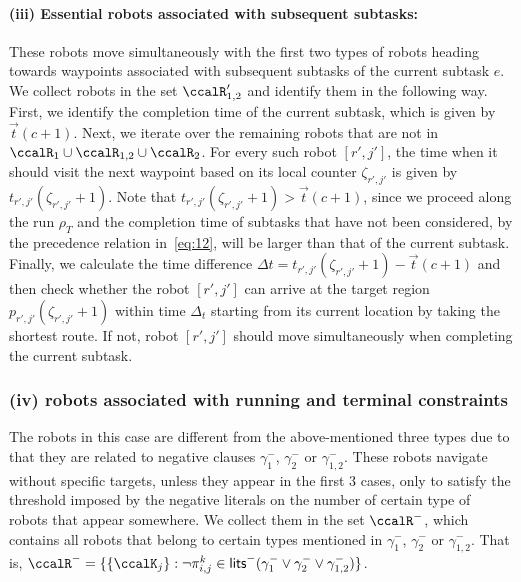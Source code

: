\documentclass[Afour,sageh,times]{sagej}
\renewcommand{\ap}[3]{\mathcal{\pi}_{{#1},{#2}}^{#3}}
\newcommand{\domanda}[1]{\subsubsection*{#1}}
\begin{document}
{\paragraph{(iii) Essential robots associated with subsequent subtasks:} These robots move simultaneously with the first two types of robots heading towards  waypoints associated with subsequent subtasks of the current subtask $e$. We collect robots in the set $\ccalR'_{1,2}$ and identify them in the following way. First, we identify the completion time  of the current subtask, which is given by $\vec{t}(c+1)$.  Next, we iterate over the remaining robots that are not in $\ccalR_1 \cup \ccalR_{1,2} \cup \ccalR_2$. For every such robot $[r',j']$, the time when it should visit the next waypoint based on its local counter $\zeta_{r',j'}$ is given by $t_{r',j'}(\zeta_{r',j'}+1)$. Note that {$t_{r', j'}(\zeta_{r',j'}+1) > \vec{t}(c+1)$}, since we proceed along the run $\rho_T$ and the completion time of  subtasks that have not been considered, by the precedence relation in~\eqref{eq:12}, will be larger than that of the current subtask. Finally, we calculate the time difference $\Delta t = t_{r', j'}(\zeta_{r',j'}+1) - \vec{t}(c+1)$  and then check whether the robot $[r', j']$ can arrive at the target region $p_{r',j'}(\zeta_{r',j'}+1)$  within time $\Delta_t$ starting from  its current location by taking the shortest route. {If not, robot $[r', j']$ should move simultaneously when completing the current subtask.}
\domanda{(iv) robots associated with running and terminal constraints} The robots in this case  are different from the above-mentioned three types due to that they are related to negative clauses $\gamma_1^-$, $\gamma_2^-$ or $\gamma_{1,2}^-$. These robots navigate without specific targets, unless they appear in the first 3 cases, only to satisfy the threshold imposed by the negative literals on the number of certain type of robots that appear somewhere. We collect them in the set $\ccalR^-$, which contains all robots that belong to certain types mentioned in $\gamma_1^-$, $\gamma_2^-$ or $\gamma_{1,2}^-$. That is, $\ccalR^- = \{\{\ccalK_j\}: \neg \ap{i}{j}{k} \in \mathsf{lits}^- (\gamma_1^- \vee \gamma_2^- \vee \gamma_{1,2}^-) \}$.

}
\end{document}
